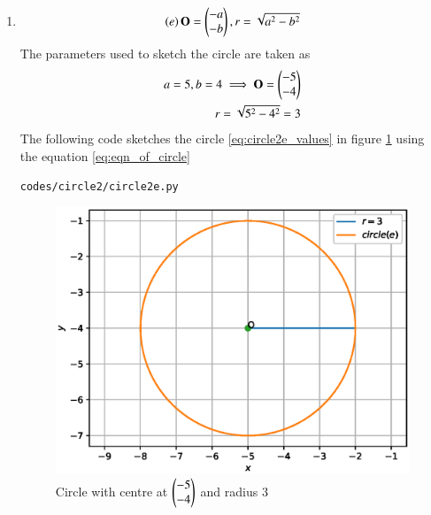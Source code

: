 \begin{enumerate}[label=\thesection.\arabic*.,ref=\thesection.\theenumi]
\item
\begin{align}
\left(e\right)\mathbf{O}=\begin{pmatrix}-a\\-b\end{pmatrix}, r=\sqrt{a^2-b^2}
\label{eq:circle2e}
\end{align}
The parameters used to sketch the circle are taken as 
\begin{align}
a=5,b=4
\implies \mathbf{O}=\begin{pmatrix}-5\\-4\end{pmatrix}
\\
r=\sqrt{5^2-4^2}=3
\label{eq:circle2e_values}
\end{align}
The following code sketches the circle \ref{eq:circle2e_values} in figure \ref{fig:circle2e} using the equation \ref{eq:eqn_of_circle}
\begin{lstlisting}
codes/circle2/circle2e.py
\end{lstlisting}
\begin{figure}[!ht]
\centering
\includegraphics[width=\columnwidth]{./codes/circle2/pyfigs/circle2e.eps}
\caption{Circle with centre at $\begin{pmatrix}-5\\-4\end{pmatrix}$ and radius $3$}
\label{fig:circle2e}
\end{figure}



\end{enumerate}
